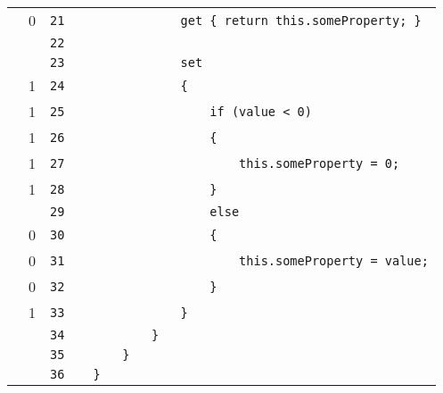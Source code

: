 \documentclass[a4paper,landscape,10pt]{article}
\begin{document}
\begin{longtable}[l]{lrrll}
\cellcolor{red} & 0 & \verb~21~ & & \verb~            get { return this.someProperty; }~\\
\cellcolor{gray} &  & \verb~22~ & & \verb~~\\
\cellcolor{gray} &  & \verb~23~ & & \verb~            set~\\
\cellcolor{green} & 1 & \verb~24~ & & \verb~            {~\\
\cellcolor{orange} & 1 & \verb~25~ & & \verb~                if (value < 0)~\\
\cellcolor{green} & 1 & \verb~26~ & & \verb~                {~\\
\cellcolor{green} & 1 & \verb~27~ & & \verb~                    this.someProperty = 0;~\\
\cellcolor{green} & 1 & \verb~28~ & & \verb~                }~\\
\cellcolor{gray} &  & \verb~29~ & & \verb~                else~\\
\cellcolor{red} & 0 & \verb~30~ & & \verb~                {~\\
\cellcolor{red} & 0 & \verb~31~ & & \verb~                    this.someProperty = value;~\\
\cellcolor{red} & 0 & \verb~32~ & & \verb~                }~\\
\cellcolor{green} & 1 & \verb~33~ & & \verb~            }~\\
\cellcolor{gray} &  & \verb~34~ & & \verb~        }~\\
\cellcolor{gray} &  & \verb~35~ & & \verb~    }~\\
\cellcolor{gray} &  & \verb~36~ & & \verb~}~\\
\end{longtable}
\end{document}

